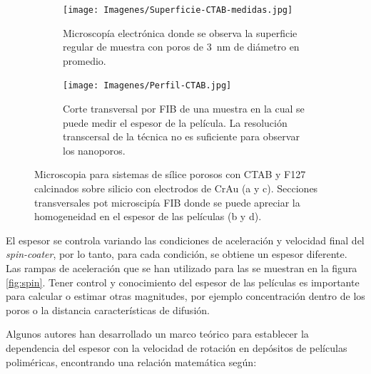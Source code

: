 \begin{figure}[bh!]
\begin{subfigure}[t]{0.495\textwidth}
			       		\label{fig:sem_homogeneidad2}
			       		\end{subfigure}	
			       	\begin{subfigure}[t]{0.495\textwidth}
			        	\texttt{[image: Imagenes/Superficie-CTAB-medidas.jpg]}
			       		\caption{Microscopía electrónica donde se observa la superficie regular de muestra \pdmC\space con poros de \SI{3}{nm} de diámetro en promedio.}
			       		\label{fig:sem_homogeneidad3}
			       		\end{subfigure}
					\begin{subfigure}[t]{0.49\textwidth}
			 	   	    \texttt{[image: Imagenes/Perfil-CTAB.jpg]}
			       		\caption{Corte transversal por FIB de una muestra \pdmC\space en la cual se puede medir el espesor de la película. La resolución transcersal de la técnica no es suficiente para observar los nanoporos.}
			       		\label{fig:sem_homogeneidad4}
			       		\end{subfigure}	
					
					\vspace{-2mm}
					 \caption[MEB \pdmC\space y \pdmF.]{Microscopia para sistemas de sílice porosos con CTAB y F127 calcinados sobre silicio con electrodos de Cr\textbar Au (a y c). Secciones transversales pot microscipía FIB donde se puede apreciar la homogeneidad en el espesor de las películas (b y d).}
					 \label{fig:sem_homogeneidad}	
				     \vspace*{0.2cm}
				     \end{figure}
 	
		 El espesor se controla variando las condiciones de aceleración y velocidad final del \textit{spin-coater}, por lo tanto, para cada condición, se obtiene un espesor diferente. Las rampas de aceleración que se han utilizado para las \pdm\space se muestran en la figura \ref{fig:spin}. Tener control y conocimiento del espesor de las películas es importante para calcular o estimar otras magnitudes, por ejemplo concentración dentro de los poros o la distancia características de difusión. 

		 Algunos autores han desarrollado un marco teórico para establecer la dependencia del espesor con la velocidad de rotación en depósitos de películas poliméricas, encontrando una relación matemática según: \cite{Norrman2005,Meyerhofer1978,Bornside1989,Lora1990}
	

